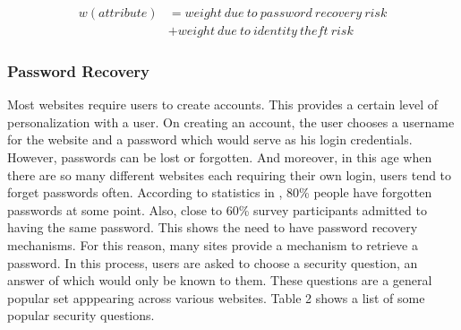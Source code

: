 \documentclass[10pt,conference]{IEEEtran}
\begin{document}
\begin{align*}
w(attribute) &= weight\ due\ to\ password\ recovery\ risk \\
		&+ weight\ due\ to\ identity\ theft\ risk
\end{align*}

\subsubsection{Password Recovery}
Most websites require users to create accounts. This provides a certain level of personalization with a user. On creating an account, the user chooses a username for the website and a password which would serve as his login credentials. However, passwords can be lost or forgotten. And moreover, in this age when there are so many different websites each requiring their own login, users tend to forget passwords often. According to statistics in \cite{passwordstats}, 80\% people have forgotten passwords at some point. Also, close to 60\% survey participants admitted to having the same password. This shows the need to have password recovery mechanisms. For this reason, many sites provide a mechanism to retrieve a password. In this process, users are asked to choose a security question, an answer of which would only be known to them. These questions are a general popular set apppearing across various websites. Table 2 shows a list of some popular security questions. 
\end{document}
